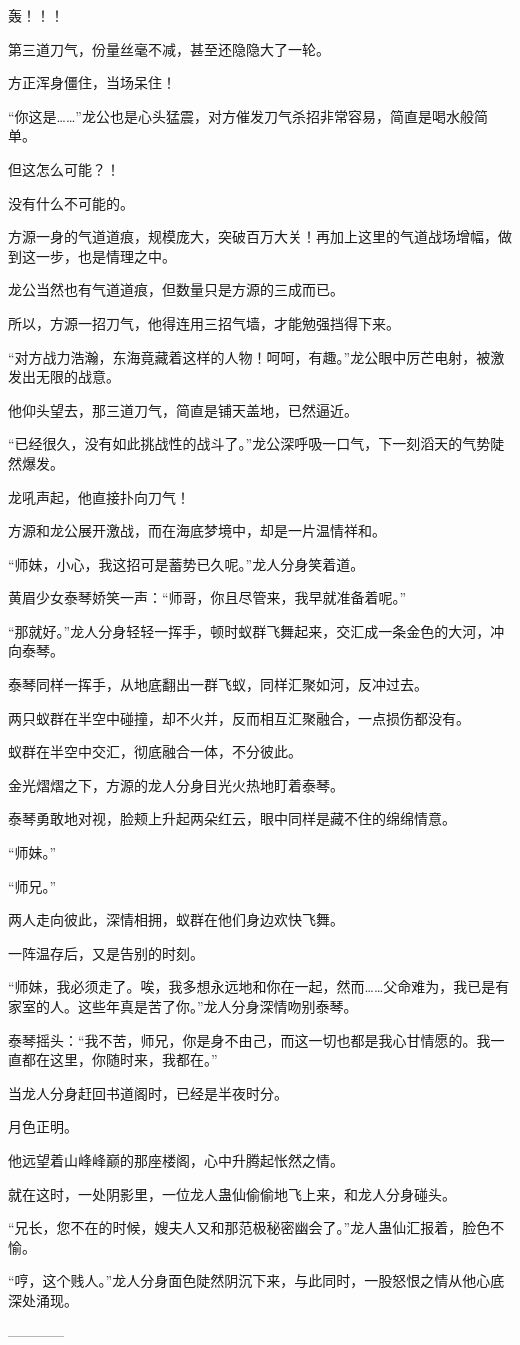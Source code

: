 \begin{this_body}
轰！！！

第三道刀气，份量丝毫不减，甚至还隐隐大了一轮。

方正浑身僵住，当场呆住！

“你这是……”龙公也是心头猛震，对方催发刀气杀招非常容易，简直是喝水般简单。

但这怎么可能？！

没有什么不可能的。

方源一身的气道道痕，规模庞大，突破百万大关！再加上这里的气道战场增幅，做到这一步，也是情理之中。

龙公当然也有气道道痕，但数量只是方源的三成而已。

所以，方源一招刀气，他得连用三招气墙，才能勉强挡得下来。

“对方战力浩瀚，东海竟藏着这样的人物！呵呵，有趣。”龙公眼中厉芒电射，被激发出无限的战意。

他仰头望去，那三道刀气，简直是铺天盖地，已然逼近。

“已经很久，没有如此挑战性的战斗了。”龙公深呼吸一口气，下一刻滔天的气势陡然爆发。

龙吼声起，他直接扑向刀气！

方源和龙公展开激战，而在海底梦境中，却是一片温情祥和。

“师妹，小心，我这招可是蓄势已久呢。”龙人分身笑着道。

黄眉少女泰琴娇笑一声：“师哥，你且尽管来，我早就准备着呢。”

“那就好。”龙人分身轻轻一挥手，顿时蚁群飞舞起来，交汇成一条金色的大河，冲向泰琴。

泰琴同样一挥手，从地底翻出一群飞蚁，同样汇聚如河，反冲过去。

两只蚁群在半空中碰撞，却不火并，反而相互汇聚融合，一点损伤都没有。

蚁群在半空中交汇，彻底融合一体，不分彼此。

金光熠熠之下，方源的龙人分身目光火热地盯着泰琴。

泰琴勇敢地对视，脸颊上升起两朵红云，眼中同样是藏不住的绵绵情意。

“师妹。”

“师兄。”

两人走向彼此，深情相拥，蚁群在他们身边欢快飞舞。

一阵温存后，又是告别的时刻。

“师妹，我必须走了。唉，我多想永远地和你在一起，然而……父命难为，我已是有家室的人。这些年真是苦了你。”龙人分身深情吻别泰琴。

泰琴摇头：“我不苦，师兄，你是身不由己，而这一切也都是我心甘情愿的。我一直都在这里，你随时来，我都在。”

当龙人分身赶回书道阁时，已经是半夜时分。

月色正明。

他远望着山峰峰巅的那座楼阁，心中升腾起怅然之情。

就在这时，一处阴影里，一位龙人蛊仙偷偷地飞上来，和龙人分身碰头。

“兄长，您不在的时候，嫂夫人又和那范极秘密幽会了。”龙人蛊仙汇报着，脸色不愉。

“哼，这个贱人。”龙人分身面色陡然阴沉下来，与此同时，一股怒恨之情从他心底深处涌现。

------------

\end{this_body}

